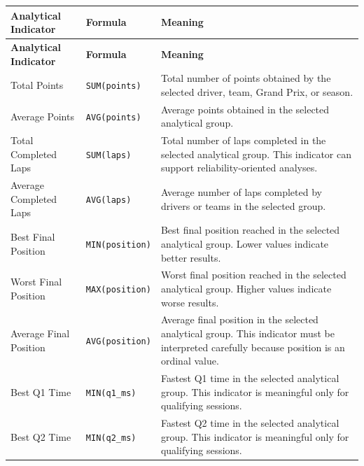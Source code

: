 \documentclass[a4paper,11pt]{article}
\begin{document}
	\begin{longtable}{|p{4.5cm}|p{5.2cm}|p{6cm}|}
		\hline
		\textbf{Analytical Indicator} & \textbf{Formula} & \textbf{Meaning} \\
		\hline
		\endfirsthead
		
		\hline
		\textbf{Analytical Indicator} & \textbf{Formula} & \textbf{Meaning} \\
		\hline
		\endhead
		
		Total Points
		& \texttt{SUM(points)}
		& Total number of points obtained by the selected driver, team, Grand Prix, or
		season. \\
		\hline
		
		Average Points
		& \texttt{AVG(points)}
		& Average points obtained in the selected analytical group. \\
		\hline
		
		Total Completed Laps
		& \texttt{SUM(laps)}
		& Total number of laps completed in the selected analytical group. This indicator
		can support reliability-oriented analyses. \\
		\hline
		
		Average Completed Laps
		& \texttt{AVG(laps)}
		& Average number of laps completed by drivers or teams in the selected group. \\
		\hline
		
		Best Final Position
		& \texttt{MIN(position)}
		& Best final position reached in the selected analytical group. Lower values indicate
		better results. \\
		\hline
		
		Worst Final Position
		& \texttt{MAX(position)}
		& Worst final position reached in the selected analytical group. Higher values indicate
		worse results. \\
		\hline
		
		Average Final Position
		& \texttt{AVG(position)}
		& Average final position in the selected analytical group. This indicator must be
		interpreted carefully because position is an ordinal value. \\
		\hline
		
		Best Q1 Time
		& \texttt{MIN(q1\_ms)}
		& Fastest Q1 time in the selected analytical group. This indicator is meaningful only
		for qualifying sessions. \\
		\hline
		
		Best Q2 Time
		& \texttt{MIN(q2\_ms)}
		& Fastest Q2 time in the selected analytical group. This indicator is meaningful only
		for qualifying sessions. \\
		\hline
		

\end{longtable}
\end{document}
